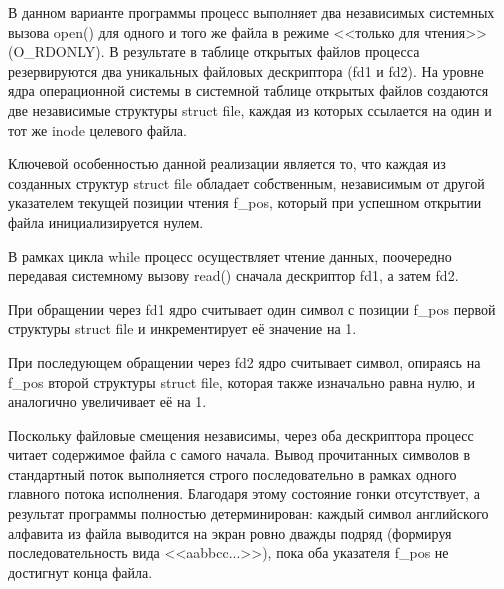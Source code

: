 


В данном варианте программы процесс выполняет два независимых системных 
вызова open() для одного и того же файла в режиме <<только для чтения>> (O\_RDONLY). 
В результате в таблице открытых файлов процесса резервируются два уникальных 
файловых дескриптора (fd1 и fd2). На уровне ядра операционной системы в 
системной таблице открытых файлов создаются две независимые структуры 
struct file, каждая из которых ссылается на один и тот же inode целевого файла.

Ключевой особенностью данной реализации является то, что каждая из 
созданных структур struct file обладает собственным, независимым от 
другой указателем текущей позиции чтения f\_pos, который при успешном 
открытии файла инициализируется нулем.

В рамках цикла while процесс осуществляет чтение данных, поочередно 
передавая системному вызову read() сначала дескриптор fd1, а затем fd2.

При обращении через fd1 ядро считывает один символ с позиции f\_pos 
первой структуры struct file и инкрементирует её значение на 1.

При последующем обращении через fd2 ядро считывает символ, опираясь 
на f\_pos второй структуры struct file, которая также изначально 
равна нулю, и аналогично увеличивает её на 1.

Поскольку файловые смещения независимы, через оба 
дескриптора процесс читает содержимое файла с самого начала. 
Вывод прочитанных символов в стандартный поток выполняется строго 
последовательно в рамках одного главного потока исполнения. 
Благодаря этому состояние гонки отсутствует, а результат 
программы полностью детерминирован: каждый символ английского 
алфавита из файла выводится на экран ровно дважды подряд 
(формируя последовательность вида <<aabbcc...>>), пока оба 
указателя f\_pos не достигнут конца файла.

